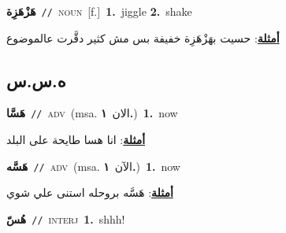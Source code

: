 \documentclass[10pt,a4paper,twoside]{article} %
\begin{document}
\begin{multicols}{2}
{\setlength\topsep{0pt}\textbf{\foreignlanguage{arabic}{هَزْهَزِة}}\ {\color{gray}\texttt{//}\color{black}}\ \textsc{noun}\ [f.]\ \textbf{1.}~jiggle  \textbf{2.}~shake\  \begin{flushright}\color{gray}\foreignlanguage{arabic}{\textbf{\underline{\foreignlanguage{arabic}{أمثلة}}}: حسيت بهَزْهَزِة خفيفة بس مش كثير دقَّرت عالموضوع}\end{flushright}\color{black}} \vspace{2mm}

\vspace{-3mm}
\subsection*{\color{blue}\foreignlanguage{arabic}{ه.س.س}\color{blue}{}} 

{\setlength\topsep{0pt}\textbf{\foreignlanguage{arabic}{هَسَّا}}\ {\color{gray}\texttt{//}\color{black}}\ \textsc{adv}\ \color{gray}(msa. \foreignlanguage{arabic}{الان}~\foreignlanguage{arabic}{\textbf{١.}})\color{black}\ \textbf{1.}~now\  \begin{flushright}\color{gray}\foreignlanguage{arabic}{\textbf{\underline{\foreignlanguage{arabic}{أمثلة}}}: انا هسا طايحة على البلد}\end{flushright}\color{black}} \vspace{2mm}

{\setlength\topsep{0pt}\textbf{\foreignlanguage{arabic}{هَسَّه}}\ {\color{gray}\texttt{//}\color{black}}\ \textsc{adv}\ \color{gray}(msa. \foreignlanguage{arabic}{الآن}~\foreignlanguage{arabic}{\textbf{١.}})\color{black}\ \textbf{1.}~now\  \begin{flushright}\color{gray}\foreignlanguage{arabic}{\textbf{\underline{\foreignlanguage{arabic}{أمثلة}}}: هَسَّه بروحله استنى علي شوي}\end{flushright}\color{black}} \vspace{2mm}

{\setlength\topsep{0pt}\textbf{\foreignlanguage{arabic}{هُسّ}}\ {\color{gray}\texttt{//}\color{black}}\ \textsc{interj}\ \textbf{1.}~shhh!\ } \vspace{2mm}


\end{multicols}
\end{document}
